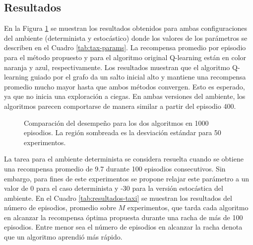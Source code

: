 \subsection{Resultados}

En la Figura \ref{fig:results-taxi} se muestran los resultados obtenidos
para ambas configuraciones del ambiente (determinista y estocástico) donde
los valores de los parámetros se describen en el Cuadro \ref{tab:tax-params}.
La recompensa promedio por episodio para el método propuesto y para el algoritmo
original Q-learning están en color naranja y azul, respectivamente. 
Los resultados muestran que el algoritmo Q-learning guiado por el grafo da un salto inicial alto y mantiene una recompensa promedio mucho mayor hasta que ambos métodos convergen. Esto es esperado, ya que
no inicia una exploración a ciegas. En ambas versiones del ambiente, los algoritmos parecen comportarse de manera similar a partir del episodio 400.

\begin{figure}[H]
  \centering
  \hfill
  \caption{Comparación del desempeño para los dos algoritmos en 1000 episodios. La región sombreada es la desviación estándar para 50 experimentos.}
  \label{fig:results-taxi}
\end{figure}

La tarea para el ambiente determinista se considera resuelta cuando se obtiene una recompensa promedio de 9.7 durante 100 episodios consecutivos. Sin embargo, para fines de este experimentos se propone relajar este parámetro a un valor de 0 para el caso determinista y -30 para la versión estocástica del ambiente. En el Cuadro \ref{tab:resultados-taxi} se muestran los resultados del número de episodios, promedio sobre $M$ experimentos,
que tarda cada algoritmo en alcanzar la recompensa óptima propuesta durante una racha de más de 100 episodios. Entre menor sea el número de episodios en alcanzar la racha denota que un algoritmo aprendió más rápido.

